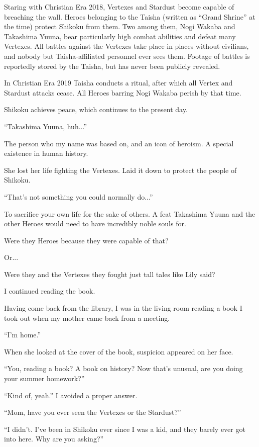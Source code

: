 Staring with Christian Era 2018, Vertexes and Stardust become capable of breaching the wall. Heroes belonging to the Taisha (written as ``Grand Shrine'' at the time) protect Shikoku from them. Two among them, Nogi Wakaba and Takashima Yuuna, bear particularly high combat abilities and defeat many Vertexes. All battles against the Vertexes take place in places without civilians, and nobody but Taisha-affiliated personnel ever sees them. Footage of battles is reportedly stored by the Taisha, but has never been publicly revealed.

In Christian Era 2019 Taisha conducts a ritual, after which all Vertex and Stardust attacks cease. All Heroes barring Nogi Wakaba perish by that time.

Shikoku achieves peace, which continues to the present day.

``Takashima Yuuna, huh...''

The person who my name was based on, and an icon of heroism. A special existence in human history.

She lost her life fighting the Vertexes. Laid it down to protect the people of Shikoku.

``That's not something you could normally do...''

To sacrifice your own life for the sake of others. A feat Takashima Yuuna and the other Heroes would need to have incredibly noble souls for.

Were they Heroes because they were capable of that?

Or...

Were they and the Vertexes they fought just tall tales like Lily said?

I continued reading the book.

Having come back from the library, I was in the living room reading a book I took out when my mother came back from a meeting.

``I'm home.''

When she looked at the cover of the book, suspicion appeared on her face.

``You, reading a book? A book on history? Now that's unusual, are you doing your summer homework?''

``Kind of, yeah.'' I avoided a proper answer.

``Mom, have you ever seen the Vertexes or the Stardust?''

``I didn't. I've been in Shikoku ever since I was a kid, and they barely ever got into here. Why are you asking?''

